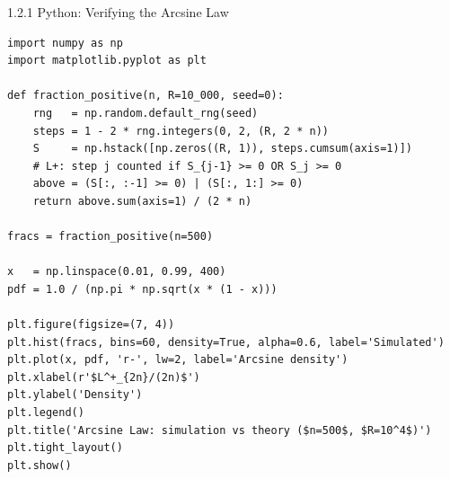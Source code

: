 \documentclass[aspectratio=169,10pt]{beamer}
\begin{document}
\begin{frame}[fragile]{1.2.1 Python: Verifying the Arcsine Law}

\begin{lstlisting}[style=python, caption={Arcsine law: simulation vs theory}]
import numpy as np
import matplotlib.pyplot as plt

def fraction_positive(n, R=10_000, seed=0):
    rng   = np.random.default_rng(seed)
    steps = 1 - 2 * rng.integers(0, 2, (R, 2 * n))
    S     = np.hstack([np.zeros((R, 1)), steps.cumsum(axis=1)])
    # L+: step j counted if S_{j-1} >= 0 OR S_j >= 0
    above = (S[:, :-1] >= 0) | (S[:, 1:] >= 0)
    return above.sum(axis=1) / (2 * n)

fracs = fraction_positive(n=500)

x   = np.linspace(0.01, 0.99, 400)
pdf = 1.0 / (np.pi * np.sqrt(x * (1 - x)))

plt.figure(figsize=(7, 4))
plt.hist(fracs, bins=60, density=True, alpha=0.6, label='Simulated')
plt.plot(x, pdf, 'r-', lw=2, label='Arcsine density')
plt.xlabel(r'$L^+_{2n}/(2n)$')
plt.ylabel('Density')
plt.legend()
plt.title('Arcsine Law: simulation vs theory ($n=500$, $R=10^4$)')
plt.tight_layout()
plt.show()
\end{lstlisting}

\end{frame}
\end{document}

